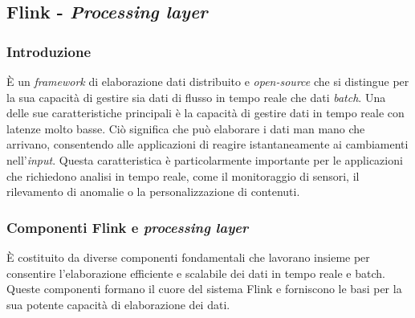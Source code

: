 \subsection{Flink - \textit{Processing layer}}
\subsubsection{Introduzione}
È un \textit{framework} di elaborazione dati distribuito e \textit{open-source} che si distingue per la sua capacità di gestire sia dati di flusso in tempo reale che dati \textit{batch}.
Una delle sue caratteristiche principali è la capacità di gestire dati in tempo reale con latenze molto basse.
Ciò significa che può elaborare i dati man mano che arrivano, consentendo alle applicazioni di reagire istantaneamente ai cambiamenti nell'\textit{input}.
Questa caratteristica è particolarmente importante per le applicazioni che richiedono analisi in tempo reale, come il monitoraggio di sensori, il rilevamento di
anomalie o la personalizzazione di contenuti.

\subsubsection{Componenti Flink e \textit{processing layer}}
È costituito da diverse componenti fondamentali che lavorano insieme per consentire l'elaborazione efficiente e scalabile dei dati in tempo reale e batch. Queste componenti formano il cuore del sistema Flink e forniscono le basi per la sua potente capacità di elaborazione dei dati.
